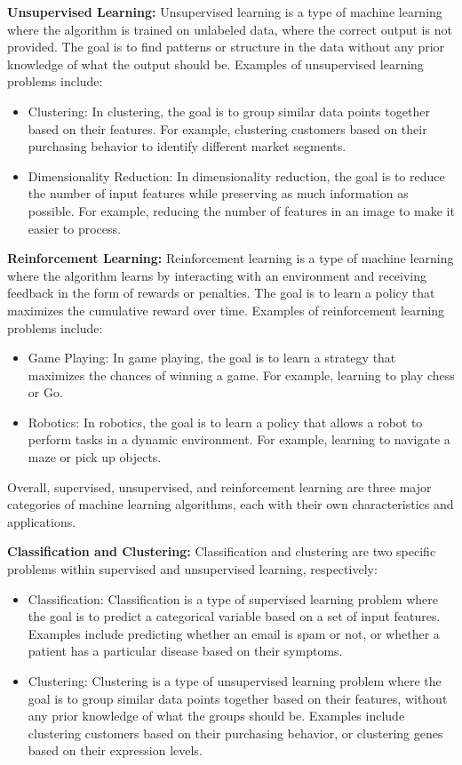 \documentclass{article}
\begin{document}
\textbf{Unsupervised Learning:}
Unsupervised learning is a type of machine learning where the algorithm is trained on unlabeled data, where the correct output is not provided. The goal is to find patterns or structure in the data without any prior knowledge of what the output should be. Examples of unsupervised learning problems include:

\begin{itemize}
\item Clustering: In clustering, the goal is to group similar data points together based on their features. For example, clustering customers based on their purchasing behavior to identify different market segments.
\item Dimensionality Reduction: In dimensionality reduction, the goal is to reduce the number of input features while preserving as much information as possible. For example, reducing the number of features in an image to make it easier to process.
\end{itemize}

\textbf{Reinforcement Learning:}
Reinforcement learning is a type of machine learning where the algorithm learns by interacting with an environment and receiving feedback in the form of rewards or penalties. The goal is to learn a policy that maximizes the cumulative reward over time. Examples of reinforcement learning problems include:

\begin{itemize}
\item Game Playing: In game playing, the goal is to learn a strategy that maximizes the chances of winning a game. For example, learning to play chess or Go.
\item Robotics: In robotics, the goal is to learn a policy that allows a robot to perform tasks in a dynamic environment. For example, learning to navigate a maze or pick up objects.
\end{itemize}

Overall, supervised, unsupervised, and reinforcement learning are three major categories of machine learning algorithms, each with their own characteristics and applications.

\textbf{Classification and Clustering:}
Classification and clustering are two specific problems within supervised and unsupervised learning, respectively:

\begin{itemize}
\item Classification: Classification is a type of supervised learning problem where the goal is to predict a categorical variable based on a set of input features. Examples include predicting whether an email is spam or not, or whether a patient has a particular disease based on their symptoms.
\item Clustering: Clustering is a type of unsupervised learning problem where the goal is to group similar data points together based on their features, without any prior knowledge of what the groups should be. Examples include clustering customers based on their purchasing behavior, or clustering genes based on their expression levels.
\end{itemize}
\end{document}
